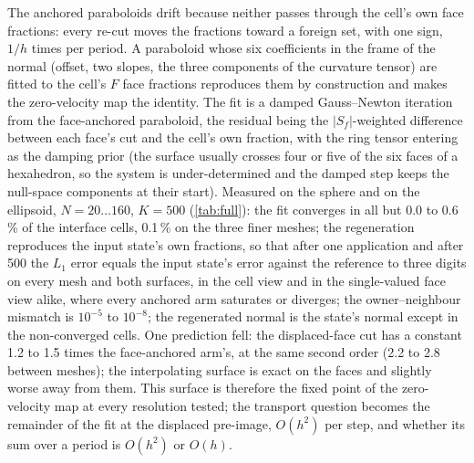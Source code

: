 \documentclass[preprint,12pt]{elsarticle}
\begin{document}
The anchored paraboloids drift because neither passes through the cell's own face fractions: every re-cut moves the fractions toward a foreign set, with one sign, $1/h$ times per period. A paraboloid whose six coefficients in the frame of the normal (offset, two slopes, the three components of the curvature tensor) are fitted to the cell's $F$ face fractions reproduces them by construction and makes the zero-velocity map the identity. The fit is a damped Gauss--Newton iteration from the face-anchored paraboloid, the residual being the $|S_f|$-weighted difference between each face's cut and the cell's own fraction, with the ring tensor entering as the damping prior (the surface usually crosses four or five of the six faces of a hexahedron, so the system is under-determined and the damped step keeps the null-space components at their start). Measured on the sphere and on the ellipsoid, $N = 20 \ldots 160$, $K = 500$ (\cref{tab:full}): the fit converges in all but 0.0 to 0.6\,\% of the interface cells, 0.1\,\% on the three finer meshes; the regeneration reproduces the input state's own fractions, so that after one application and after 500 the $L_1$ error equals the input state's error against the reference to three digits on every mesh and both surfaces, in the cell view and in the single-valued face view alike, where every anchored arm saturates or diverges; the owner--neighbour mismatch is $10^{-5}$ to $10^{-8}$; the regenerated normal is the state's normal except in the non-converged cells. One prediction fell: the displaced-face cut has a constant 1.2 to 1.5 times the face-anchored arm's, at the same second order (2.2 to 2.8 between meshes); the interpolating surface is exact on the faces and slightly worse away from them. This surface is therefore the fixed point of the zero-velocity map at every resolution tested; the transport question becomes the remainder of the fit at the displaced pre-image, $O(h^2)$ per step, and whether its sum over a period is $O(h^2)$ or $O(h)$.
\end{document}
